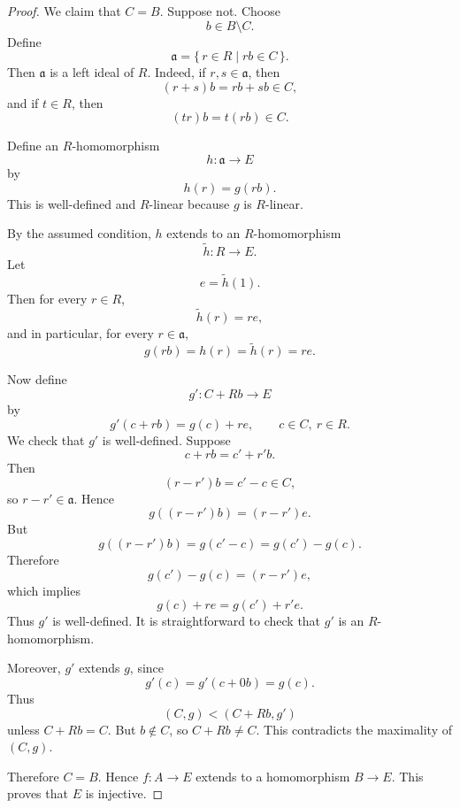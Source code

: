 \begin{proof}
                We claim that \(C=B\). Suppose not. Choose
                \[
                    b\in B\setminus C.
                \]
                Define
                \[
                    \mathfrak a=\{\,r\in R\mid rb\in C\,\}.
                \]
                Then \(\mathfrak a\) is a left ideal of \(R\). Indeed, if \(r,s\in\mathfrak a\), then
                \[
                    (r+s)b=rb+sb\in C,
                \]
                and if \(t\in R\), then
                \[
                    (tr)b=t(rb)\in C.
                \]
                
                Define an \(R\)-homomorphism
                \[
                    h:\mathfrak a\longrightarrow E
                \]
                by
                \[
                    h(r)=g(rb).
                \]
                This is well-defined and \(R\)-linear because \(g\) is \(R\)-linear.
                
                By the assumed condition, \(h\) extends to an \(R\)-homomorphism
                \[
                    \widetilde h:R\longrightarrow E.
                \]
                Let
                \[
                    e=\widetilde h(1).
                \]
                Then for every \(r\in R\),
                \[
                    \widetilde h(r)=re,
                \]
                and in particular, for every \(r\in\mathfrak a\),
                \[
                    g(rb)=h(r)=\widetilde h(r)=re.
                \]
                
                Now define
                \[
                    g':C+Rb\longrightarrow E
                \]
                by
                \[
                    g'(c+rb)=g(c)+re,
                    \qquad c\in C,\ r\in R.
                \]
                We check that \(g'\) is well-defined. Suppose
                \[
                    c+rb=c'+r'b.
                \]
                Then
                \[
                    (r-r')b=c'-c\in C,
                \]
                so \(r-r'\in\mathfrak a\). Hence
                \[
                    g((r-r')b)=(r-r')e.
                \]
                But
                \[
                    g((r-r')b)=g(c'-c)=g(c')-g(c).
                \]
                Therefore
                \[
                    g(c')-g(c)=(r-r')e,
                \]
                which implies
                \[
                    g(c)+re=g(c')+r'e.
                \]
                Thus \(g'\) is well-defined. It is straightforward to check that \(g'\) is an
                \(R\)-homomorphism.
                
                Moreover, \(g'\) extends \(g\), since
                \[
                    g'(c)=g'(c+0b)=g(c).
                \]
                Thus
                \[
                    (C,g)<(C+Rb,g')
                \]
                unless \(C+Rb=C\). But \(b\notin C\), so \(C+Rb\neq C\). This contradicts the
                maximality of \((C,g)\).
                
                Therefore \(C=B\). Hence \(f:A\to E\) extends to a homomorphism \(B\to E\).
                This proves that \(E\) is injective.
                \end{proof}

